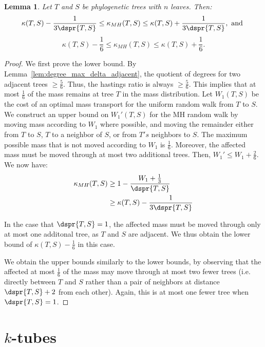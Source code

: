 \documentclass{amsart}
\newtheorem{lemma}[theorem]{Lemma}
\begin{document}
\begin{lemma}
	Let $T$ and $S$ be phylogenetic trees with $n$ leaves. Then:
	$$\kappa(T,S) - \frac{1}{3\dspr{T,S}}
	\le \kappa_{MH}(T,S)
	\le \kappa(T,S) + \frac{1}{3\dspr{T,S}}, \text{ and }$$
	$$\kappa(T,S) - \frac{1}{6}
	\le \kappa_{MH}(T,S)
	\le \kappa(T,S) + \frac{1}{6}.$$
\end{lemma}
\begin{proof}
	We first prove the lower bound.
	By Lemma~\ref{lem:degree_max_delta_adjacent}, the quotient of degrees for two adjacent trees $\ge \frac{5}{6}$.
	Thus, the hastings ratio is always $\ge \frac{5}{6}$.
	This implies that at most $\frac{1}{6}$ of the mass remains at tree $T$ in the mass distribution.
	Let $W_1(T,S)$ be the cost of an optimal mass transport for the uniform random walk from $T$ to $S$.
	We construct an upper bound on $W_1'(T,S)$ for the MH random walk by moving mass according to $W_1$ where possible, and moving the remainder either from $T$ to $S$, $T$ to a neighbor of $S$, or from $T's$ neighbors to $S$.
	The maximum possible mass that is not moved according to $W_1$ is $\frac{1}{6}$.
	Moreover, the affected mass must be moved through at most two additional trees.
	Then, $W_1' \le W_1 + \frac{2}{6}$.
	We now have:
	\begin{align*}
		\kappa_{MH}(T,S) & \ge 1 - \frac{W_1 + \frac{1}{3}}{\dspr{T,S}} \\
		& \ge \kappa(T,S) - \frac{1}{3\dspr{T,S}}
	\end{align*}

	In the case that $\dspr{T,S}=1$, the affected mass must be moved through only at most one additonal tree, as $T$ and $S$ are adjacent.
	We thus obtain the lower bound of $\kappa(T,S) - \frac{1}{6}$ in this case.

	We obtain the upper bounds similarly to the lower bounds, by observing that the affected at most $\frac{1}{6}$ of the mass may move through at most two fewer trees (i.e. directly between $T$ and $S$ rather than a pair of neighbors at distance $\dspr{T,S} + 2$ from each other).
	Again, this is at most one fewer tree when $\dspr{T,S}=1$.

\end{proof}











\section{$k$-tubes}
\end{document}
